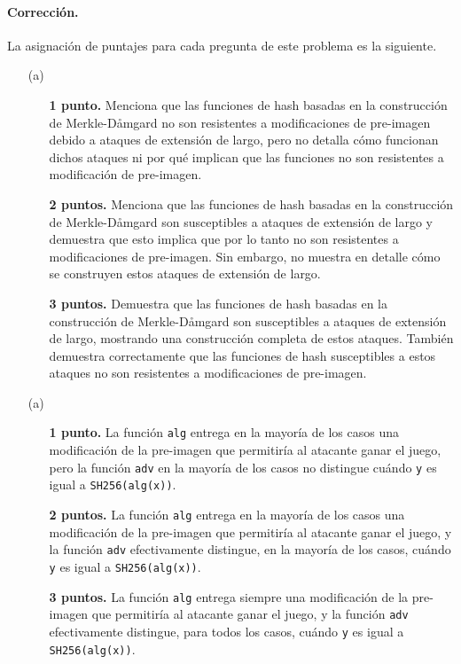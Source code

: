 \paragraph{Corrección.}
La asignación de puntajes para cada pregunta de este problema es la siguiente.
\begin{itemize}
\item[(a)]
\begin{itemize}
	\item[]\textbf{1 punto.} Menciona que las funciones de hash basadas en la construcción de Merkle-Dåmgard no son resistentes a modificaciones de pre-imagen debido a ataques de extensión de largo, pero no detalla cómo funcionan dichos ataques ni por qué implican que las funciones no son resistentes a modificación de pre-imagen.
	\item[]\textbf{2 puntos.} Menciona que las funciones de hash basadas en la construcción de Merkle-Dåmgard son susceptibles a ataques de extensión de largo y demuestra que esto implica que por lo tanto no son resistentes a modificaciones de pre-imagen. Sin embargo, no muestra en detalle cómo se construyen estos ataques de extensión de largo. 
	\item[]\textbf{3 puntos.} Demuestra que las funciones de hash basadas en la construcción de Merkle-Dåmgard son susceptibles a ataques de extensión de largo, mostrando una construcción completa de estos ataques. También demuestra correctamente que las funciones de hash susceptibles a estos ataques no son resistentes a modificaciones de pre-imagen.
\end{itemize}

\item[(a)]
\begin{itemize}
	\item[]\textbf{1 punto.} La función \texttt{alg} entrega en la mayoría de los casos una modificación de la pre-imagen que permitiría al atacante ganar el juego, pero la función \texttt{adv} en la mayoría de los casos no distingue cuándo \texttt{y} es igual a \texttt{SH256(alg(x))}.
	\item[]\textbf{2 puntos.} La función \texttt{alg} entrega en la mayoría de los casos una modificación de la pre-imagen que permitiría al atacante ganar el juego, y la función \texttt{adv} efectivamente distingue, en la mayoría de los casos, cuándo \texttt{y} es igual a \texttt{SH256(alg(x))}.
	\item[]\textbf{3 puntos.} La función \texttt{alg} entrega siempre una modificación de la pre-imagen que permitiría al atacante ganar el juego, y la función \texttt{adv} efectivamente distingue, para todos los casos, cuándo \texttt{y} es igual a \texttt{SH256(alg(x))}.
\end{itemize}
\end{itemize}
